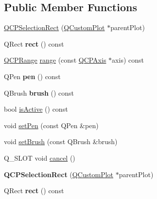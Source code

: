 \subsection*{Public Member Functions}
\begin{DoxyCompactItemize}
\item 
\hyperlink{class_q_c_p_selection_rect_ade6ee59fabcc585a1e281eb527b01867}{Q\+C\+P\+Selection\+Rect} (\hyperlink{class_q_custom_plot}{Q\+Custom\+Plot} $\ast$parent\+Plot)
\item 
Q\+Rect {\bfseries rect} () const \hypertarget{class_q_c_p_selection_rect_a426d8186b04c264eb97c0713431f42fa}{}\label{class_q_c_p_selection_rect_a426d8186b04c264eb97c0713431f42fa}

\item 
\hyperlink{class_q_c_p_range}{Q\+C\+P\+Range} \hyperlink{class_q_c_p_selection_rect_abef79a750c3469e88554fe134d0510fd}{range} (const \hyperlink{class_q_c_p_axis}{Q\+C\+P\+Axis} $\ast$axis) const 
\item 
Q\+Pen {\bfseries pen} () const \hypertarget{class_q_c_p_selection_rect_a96fe01abf40bc71863ce582d843eb07c}{}\label{class_q_c_p_selection_rect_a96fe01abf40bc71863ce582d843eb07c}

\item 
Q\+Brush {\bfseries brush} () const \hypertarget{class_q_c_p_selection_rect_a3759fd762c5913fc8a0fd6aa6ff4e7ff}{}\label{class_q_c_p_selection_rect_a3759fd762c5913fc8a0fd6aa6ff4e7ff}

\item 
bool \hyperlink{class_q_c_p_selection_rect_a5eb64ab5638c04a952e230de3766470e}{is\+Active} () const 
\item 
void \hyperlink{class_q_c_p_selection_rect_ada20b7fb1b2dcbe50523262636b06963}{set\+Pen} (const Q\+Pen \&pen)
\item 
void \hyperlink{class_q_c_p_selection_rect_ab0c66f1484418782efa01f4153611080}{set\+Brush} (const Q\+Brush \&brush)
\item 
Q\+\_\+\+S\+L\+OT void \hyperlink{class_q_c_p_selection_rect_af67bc58f4f5ce9a4dc420b9c42de235a}{cancel} ()
\item 
{\bfseries Q\+C\+P\+Selection\+Rect} (\hyperlink{class_q_custom_plot}{Q\+Custom\+Plot} $\ast$parent\+Plot)\hypertarget{class_q_c_p_selection_rect_ade6ee59fabcc585a1e281eb527b01867}{}\label{class_q_c_p_selection_rect_ade6ee59fabcc585a1e281eb527b01867}

\item 
Q\+Rect {\bfseries rect} () const \hypertarget{class_q_c_p_selection_rect_a426d8186b04c264eb97c0713431f42fa}{}\label{class_q_c_p_selection_rect_a426d8186b04c264eb97c0713431f42fa}


\end{DoxyCompactItemize}
